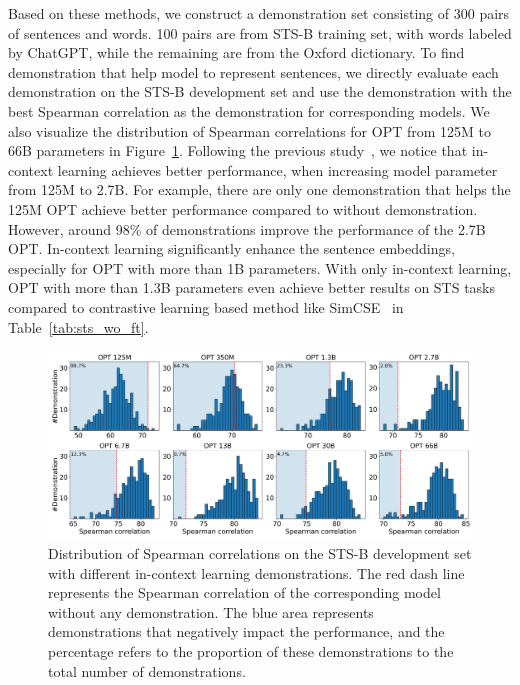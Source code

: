 \documentclass{article}
\begin{document}
Based on these methods, we construct a demonstration set consisting of 300 pairs of sentences and words.
100 pairs are from STS-B training set, with words labeled by ChatGPT, while the remaining are from the Oxford dictionary.
To find demonstration that help model to represent sentences,
we directly evaluate each demonstration on the STS-B development set and use the demonstration with the best Spearman correlation as the demonstration for corresponding models.
We also visualize the distribution of Spearman correlations for OPT from 125M to 66B parameters in Figure~\ref{fig:LLM_icl_hist}.
Following the previous study~\cite{kaplan2020scaling}, we notice that in-context learning achieves better performance, when increasing model parameter from 125M to 2.7B.
For example, there are only one demonstration that helps the 125M OPT achieve better performance compared to without demonstration.
However, around 98\% of demonstrations improve the performance of the 2.7B OPT.
In-context learning significantly enhance the sentence embeddings, especially for OPT with more than 1B parameters.
With only in-context learning, OPT with more than 1.3B parameters even achieve better results on STS tasks compared to contrastive learning based method like SimCSE~\cite{gao2021simcse} in Table~\ref{tab:sts_wo_ft}.

\begin{figure}
\centering
\vspace{-13pt}
	\includegraphics[width=\columnwidth]{LLM_icl_hist.png}
\caption{
  Distribution of Spearman correlations on the STS-B development set with different in-context learning demonstrations.
  The red dash line represents the Spearman correlation of the corresponding model without any demonstration.
  The blue area represents demonstrations that negatively impact the performance, and the percentage refers to the proportion of these demonstrations to the total number of demonstrations.
}
\vspace{-10pt}
\label{fig:LLM_icl_hist}
\end{figure}
\end{document}

